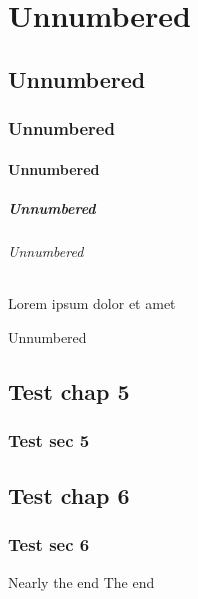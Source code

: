 \documentclass[twoside]{article}
\begin{document}
    \part*{Unnumbered}
    \chapter*{Unnumbered}
    \section*{Unnumbered}
    \subsection*{Unnumbered}
    \subsubsection*{Unnumbered}
    \paragraph*{Unnumbered} Lorem ipsum dolor et amet
    \subparagraph*{Unnumbered}
    
    \appendix
    \chapter{Test chap 5}
    \section{Test sec 5}
    
    \backmatter
    \chapter{Test chap 6}
    \section{Test sec 6}
    \clearpage
    Nearly the end
    \clearpage
    The end
\end{document}
